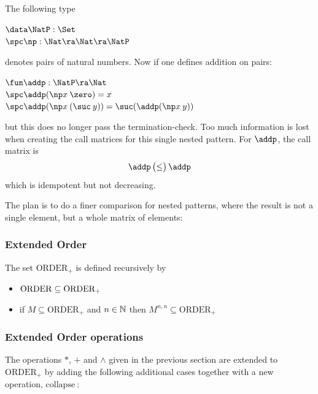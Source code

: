 The following type
\begin{bsp}
$\data \NatP : \Set$\\
$\spc \np : \Nat \ra \Nat \ra \NatP $
\end{bsp}
denotes pairs of natural numbers. Now if one defines addition on pairs:
\begin{bsp}
$\fun \addp : \NatP \ra \Nat$\\
$\spc \addp (\np x \: \zero) = x$\\
$\spc \addp (\np x \: (\suc \: y)) = \suc (\addp (\np x \: y))$
\end{bsp}
\noindent but this does no longer pass the termination-check.
Too much information is lost when creating the call matrices for this single nested pattern.
For $\addp$, the call matrix is 
\[
\addp \begin{pmatrix}
\leq \\
\end{pmatrix}\addp
\]
which is idempotent but not decreasing.
\newcommand{\coll}{\mathrm{collapse}\:}

\newcommand{\opl}{\operatorname{ORDER_{+}}}

The plan is to do a finer comparison for nested patterns, where the result is not a single element, but a whole matrix of elements:
\subsubsection{Extended Order}
The set $\opl$ is defined recursively by   
\begin{itemize}
\item
$ \order \subseteq \opl$
\item
if $ M \subseteq \opl $ and $n \in \mathbb{N} $ then $M^{ n,n} \subseteq \opl$
\end{itemize}

\subsubsection{Extended Order operations}
The operations $*$, $+$ and $\wedge$ given in the previous section are extended to $\opl$ by adding the following additional cases together with a new operation, $\coll$:

